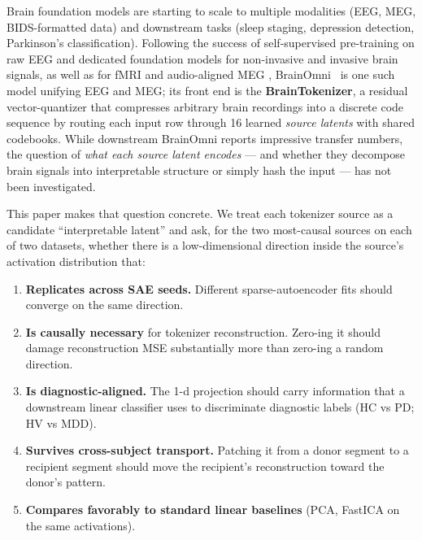 \documentclass[11pt]{article}
\begin{document}
Brain foundation models are starting to scale to multiple modalities (EEG, MEG,
BIDS-formatted data) and downstream tasks (sleep staging, depression detection,
Parkinson's classification). Following the success of self-supervised
pre-training on raw {EEG} \cite{bendr2021,banville2021} and dedicated foundation
models for non-invasive \cite{labram2024,biot2023} and invasive
\cite{brant2023,brant2_2024} brain signals, as well as for {fMRI}
\cite{brainlm2024} and audio-aligned {MEG} \cite{defossez2023brain},
BrainOmni~\cite{brainomni2025} is one such model unifying {EEG} and {MEG}; its
front end is the \textbf{BrainTokenizer}, a residual vector-quantizer
\cite{vqvae2017,vqvae2_2019,soundstream2021,encodec2022} that compresses
arbitrary brain recordings into a discrete code sequence by routing each input
row through 16 learned \emph{source latents} with shared codebooks. While
downstream BrainOmni reports impressive transfer numbers, the question of
\emph{what each source latent encodes} --- and whether they decompose brain
signals into interpretable structure or simply hash the input --- has not been
investigated.

This paper makes that question concrete. We treat each tokenizer source as a
candidate ``interpretable latent'' and ask, for the two most-causal sources on
each of two datasets, whether there is a low-dimensional direction inside the
source's activation distribution that:
\begin{enumerate}[leftmargin=1.4em,itemsep=0.2em,topsep=0.3em]
\item \textbf{Replicates across SAE seeds.} Different sparse-autoencoder fits
should converge on the same direction.
\item \textbf{Is causally necessary} for tokenizer reconstruction. Zero-ing it
should damage reconstruction MSE substantially more than zero-ing a random
direction.
\item \textbf{Is diagnostic-aligned.} The 1-d projection should carry information
that a downstream linear classifier uses to discriminate diagnostic labels
(HC vs PD; HV vs MDD).
\item \textbf{Survives cross-subject transport.} Patching it from a donor segment
to a recipient segment should move the recipient's reconstruction toward the
donor's pattern.
\item \textbf{Compares favorably to standard linear baselines} (PCA, FastICA on
the same activations).
\end{enumerate}
\end{document}
